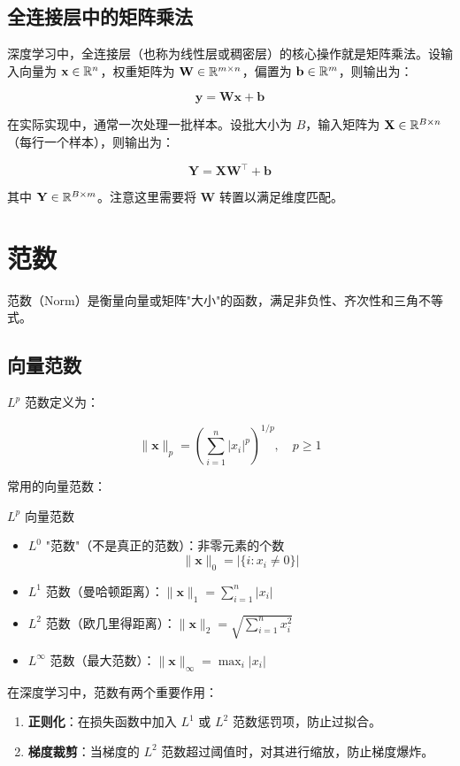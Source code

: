 \subsection{全连接层中的矩阵乘法}

深度学习中，全连接层（也称为线性层或稠密层）的核心操作就是矩阵乘法。设输入向量为 $\mathbf{x}\in\mathbb{R}^n$，权重矩阵为 $\mathbf{W}\in\mathbb{R}^{m\times n}$，偏置为 $\mathbf{b}\in\mathbb{R}^m$，则输出为：

\[
\mathbf{y} = \mathbf{W}\mathbf{x} + \mathbf{b}
\]

在实际实现中，通常一次处理一批样本。设批大小为 $B$，输入矩阵为 $\mathbf{X}\in\mathbb{R}^{B\times n}$（每行一个样本），则输出为：

\[
\mathbf{Y} = \mathbf{X}\mathbf{W}^{\top} + \mathbf{b}
\]

其中 $\mathbf{Y}\in\mathbb{R}^{B\times m}$。注意这里需要将 $\mathbf{W}$ 转置以满足维度匹配。

\section{范数}

范数（Norm）是衡量向量或矩阵"大小"的函数，满足非负性、齐次性和三角不等式。

\subsection{向量范数}

$L^p$ 范数定义为：

\[
\|\mathbf{x}\|_p = \left(\sum_{i=1}^{n} |x_i|^p\right)^{1/p}, \quad p\geq 1
\]

常用的向量范数：

\begin{mydefinition}{$L^p$ 向量范数}
\begin{itemize}
    \item $L^0$ "范数"（不是真正的范数）：非零元素的个数
    \[
    \|\mathbf{x}\|_0 = |\{i : x_i \neq 0\}|
    \]
    \item $L^1$ 范数（曼哈顿距离）：$\|\mathbf{x}\|_1 = \sum_{i=1}^{n} |x_i|$
    \item $L^2$ 范数（欧几里得距离）：$\|\mathbf{x}\|_2 = \sqrt{\sum_{i=1}^{n} x_i^2}$
    \item $L^{\infty}$ 范数（最大范数）：$\|\mathbf{x}\|_{\infty} = \max_i |x_i|$
\end{itemize}
\end{mydefinition}

在深度学习中，范数有两个重要作用：
\begin{enumerate}
    \item \textbf{正则化}：在损失函数中加入 $L^1$ 或 $L^2$ 范数惩罚项，防止过拟合。
    \item \textbf{梯度裁剪}：当梯度的 $L^2$ 范数超过阈值时，对其进行缩放，防止梯度爆炸。
\end{enumerate}

